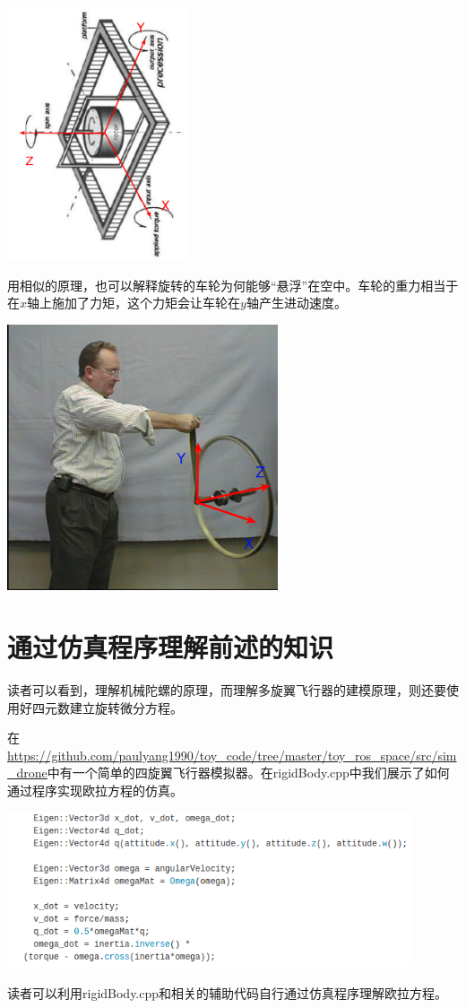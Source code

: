 \documentclass[11pt]{article}
\begin{document}
\begin{center}
\includegraphics[width=0.4\textwidth]{images/gyroscopeAxesR.png}
\end{center}

用相似的原理，也可以解释旋转的车轮为何能够“悬浮”在空中。车轮的重力相当于在$x$轴上施加了力矩，这个力矩会让车轮在$y$轴产生进动速度。
\begin{center}
\includegraphics[width=0.6\textwidth]{images/BicycleWheelGyro1.png}
\end{center}

\section{通过仿真程序理解前述的知识}
读者可以看到，理解机械陀螺的原理，而理解多旋翼飞行器的建模原理，则还要使用好四元数建立旋转微分方程。

在\url{https://github.com/paulyang1990/toy_code/tree/master/toy_ros_space/src/sim_drone}中有一个简单的四旋翼飞行器模拟器。在rigidBody.cpp中我们展示了如何通过程序实现欧拉方程的仿真。

\begin{center}
\includegraphics[width=0.9\textwidth]{images/code.png}
\end{center}

读者可以利用rigidBody.cpp和相关的辅助代码自行通过仿真程序理解欧拉方程。


\end{document}

